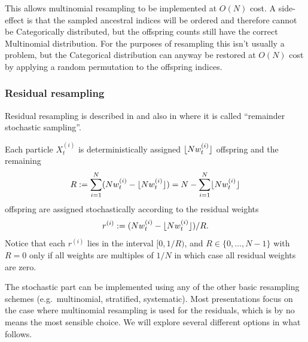 This allows multinomial resampling to be implemented at $O(N)$ cost. 
A side-effect is that the sampled ancestral indices will be ordered and therefore cannot be Categorically distributed, but the offspring counts still have the correct Multinomial distribution. For the purposes of resampling this isn't usually a problem, but the Categorical distribution can anyway be restored at $O(N)$ cost by applying a random permutation to the offspring indices.




\subsubsection{Residual resampling}
Residual resampling is described in \textcite{liu1998} and also in \textcite{whitley1994} where it is called ``remainder stochastic sampling''.

Each particle $X_{t}^{(i)}$ is deterministically assigned $\lfloor N w_t^{(i)} \rfloor$ offspring and the remaining
\begin{equation*}
R := \sum_{i=1}^N ( Nw_t^{(i)} - \lfloor N w_t^{(i)} \rfloor) = N- \sum_{i=1}^N \lfloor N w_t^{(i)} \rfloor
\end{equation*}
offspring are assigned stochastically according to the residual weights
\begin{equation*}
r^{(i)} := ( Nw_t^{(i)} - \lfloor N w_t^{(i)} \rfloor) /R .
\end{equation*}
Notice that each $r^{(i)}$ lies in the interval $[0, 1/R)$, and $R\in\{0,\dots,N-1\}$ with $R=0$ only if all weights are multiples of $1/N$ in which case all residual weights are zero.

The stochastic part can be implemented using any of the other basic resampling schemes (e.g.\ multinomial, stratified, systematic). Most presentations focus on the case where multinomial resampling is used for the residuals, which is by no means the most sensible choice. We will explore several different options in what follows.


